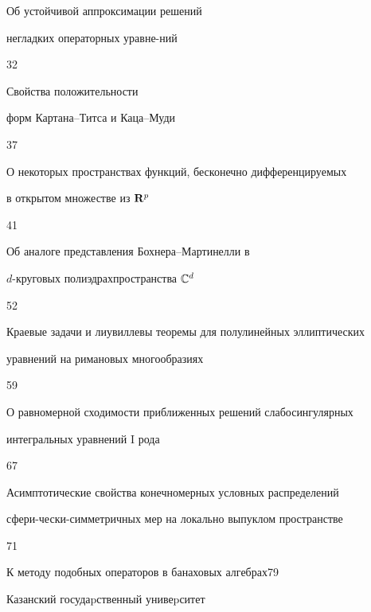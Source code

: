 

{Об устойчивой аппроксимации решений


негладких операторных уравне-\newline ний}{32}




{Свойства положительности


форм Картана--Титса и Каца--Муди}{37}




{О некоторых пространствах функций, бесконечно дифференцируемых\newline


в открытом множестве из ${\bold R}^p$}{41}




{Об аналоге представления Бохнера--Мартинелли в


$d$-круговых полиэдрах\newline пространства $\Bbb{C}^d$}{52}




{Краевые задачи и лиувиллевы теоремы для полулинейных эллиптических\newline


уравнений на римановых многообразиях}{59}




{О равномерной сходимости приближенных решений слабосингулярных\newline


интегральных уравнений I рода}{67}




{Асимптотические свойства конечномерных условных распределений 


сфери-\newline чески-симметричных мер на локально выпуклом пространстве}{71}




{К методу подобных операторов в банаховых алгебрах}{79}











\vfill


\noindent\raisebox{2pt}{\copyright} Казанский госудаpственный унивеpситет





